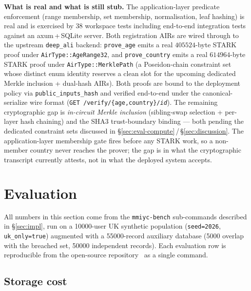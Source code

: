 \documentclass[11pt,a4paper]{article}
\begin{document}
\noindent
\textbf{What is real and what is still stub.}  The
application\nobreakdash-layer predicate enforcement (range
membership, set membership, normalisation, leaf hashing) is real
and is exercised by 38 workspace tests including end\nobreakdash-to\nobreakdash-end
integration tests against an axum\,+\,SQLite server.  Both
registration AIRs are wired through to the upstream
\texttt{deep\_ali} backend: \texttt{prove\_age} emits a real
$\num{405524}$\nobreakdash-byte STARK proof under
\texttt{AirType::AgeRange32}, and \texttt{prove\_country} emits a
real $\num{614964}$\nobreakdash-byte STARK proof under
\texttt{AirType::MerklePath} (a Poseidon\nobreakdash-chain
constraint set whose distinct enum identity reserves a clean
slot for the upcoming dedicated Merkle inclusion + dual\nobreakdash-hash
AIRs).  Both proofs are bound to the deployment policy via
\texttt{public\_inputs\_hash} and verified end\nobreakdash-to\nobreakdash-end
under the canonical\nobreakdash-serialize wire format
(\texttt{GET /verify/\{age,country\}/\textit{id}}).
The remaining cryptographic gap is
\emph{in\nobreakdash-circuit Merkle inclusion} (sibling\nobreakdash-swap
selection + per\nobreakdash-layer hash chaining) and the
SHA3 trust\nobreakdash-boundary binding — both pending the
dedicated constraint sets discussed in
\S\ref{sec:eval-compute}\,/\,\S\ref{sec:discussion}.  The
application\nobreakdash-layer membership gate fires before any
STARK work, so a non\nobreakdash-member country never reaches the
prover; the gap is in what the cryptographic transcript currently
attests, not in what the deployed system accepts.

\section{Evaluation}
\label{sec:eval}

All numbers in this section come from the
\texttt{mmiyc-bench} sub\nobreakdash-commands described in
\S\ref{sec:impl}, run on a \num{10000}\nobreakdash-user UK
synthetic population (\texttt{seed=2026}, \texttt{uk\_only=true})
augmented with a \num{55000}\nobreakdash-record auxiliary database
(\num{5000} overlap with the breached set, \num{50000} independent
records).  Each evaluation row is reproducible from the open\nobreakdash-source
repository~\cite{mmiyc-impl} as a single command.

\subsection{Storage cost}
\label{sec:eval-storage}
\end{document}
